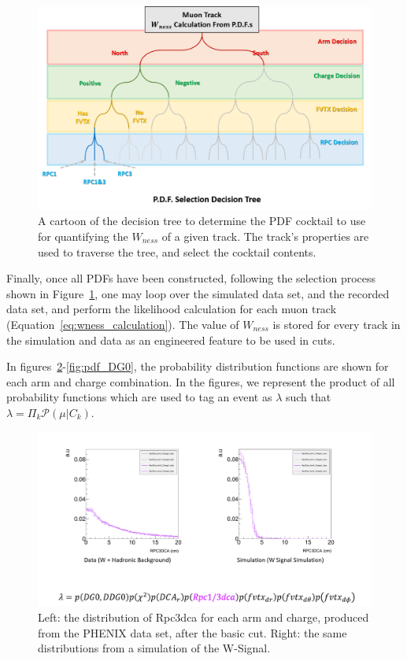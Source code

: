 \begin{figure}[ht]
  \centering
  \includegraphics[width=\linewidth,trim=4 4 4 4,clip]{./figures/pdf_selection_tree.png}
  \caption{
    A cartoon of the decision tree to determine the PDF cocktail to use for
    quantifying the $W_{ness}$ of a given track. The track's properties are used
    to traverse the tree, and select the cocktail contents.
  }
  \label{fig:pdf_selection_tree}
\end{figure}

Finally, once all PDFs have been constructed, following the selection process
shown in Figure~\ref{fig:pdf_selection_tree}, one may loop over the simulated
data set, and the recorded data set, and perform the likelihood calculation for
each muon track (Equation~\ref{eq:wness_calculation}). The value of
$W_{ness}$ is stored for every track in the simulation and data as an
engineered feature to be used in cuts.

In figures~\ref{fig:pdf_rpc3dca}-\ref{fig:pdf_DG0}, the probability
distribution functions are shown for each arm and charge combination. In the
figures, we represent the product of all probability functions which are used
to tag an event as $\lambda$ such that $\lambda = \Pi_{k} \mathcal{P}(\mu \vert
C_k)$.

\begin{figure}
  \centering
  \includegraphics[width=\linewidth,trim=4 4 4 4,clip]{./figures/pdf_rpc3dca.png}
  \caption{
    Left: the distribution of Rpc3dca for each arm and charge, produced from the
    PHENIX data set, after the basic cut. Right: the same distributions from a
    simulation of the W-Signal.
  }
  \label{fig:pdf_rpc3dca}
\end{figure}


